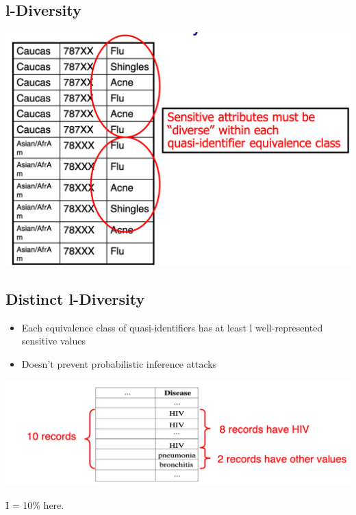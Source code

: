 \documentclass[11pt]{article}
\theoremstyle{definition}
\begin{document}
\subsection{l-Diversity}
\includegraphics[width=\textwidth/2]{22.png}

\subsection{Distinct l-Diversity}
\begin{itemize}
    \item Each equivalence class of quasi-identifiers has at
    least l well-represented sensitive values
    \item Doesn’t prevent probabilistic inference attacks
\end{itemize}
\includegraphics[width=\textwidth/2]{23.png}

I = 10\% here. 
\end{document}
